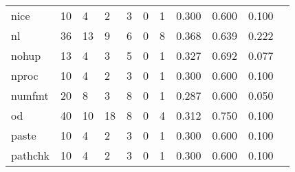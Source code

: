 \begin{longtable}{lp{1.10cm}p{1.10cm}p{1.10cm}p{1.10cm}p{1.10cm}p{1.10cm}p{1.10cm}p{1.10cm}p{1.10cm}p{1.10cm}}
nice      &                     10 &                                  4 &                                 2 &                                3 &                                 0 &                               1 &                          0.300 &                                 0.600 &                               0.100 \\
nl        &                     36 &                                 13 &                                 9 &                                6 &                                 0 &                               8 &                          0.368 &                                 0.639 &                               0.222 \\
nohup     &                     13 &                                  4 &                                 3 &                                5 &                                 0 &                               1 &                          0.327 &                                 0.692 &                               0.077 \\
nproc     &                     10 &                                  4 &                                 2 &                                3 &                                 0 &                               1 &                          0.300 &                                 0.600 &                               0.100 \\
numfmt    &                     20 &                                  8 &                                 3 &                                8 &                                 0 &                               1 &                          0.287 &                                 0.600 &                               0.050 \\
od        &                     40 &                                 10 &                                18 &                                8 &                                 0 &                               4 &                          0.312 &                                 0.750 &                               0.100 \\
paste     &                     10 &                                  4 &                                 2 &                                3 &                                 0 &                               1 &                          0.300 &                                 0.600 &                               0.100 \\
pathchk   &                     10 &                                  4 &                                 2 &                                3 &                                 0 &                               1 &                          0.300 &                                 0.600 &                               0.100 \\

\end{longtable}
